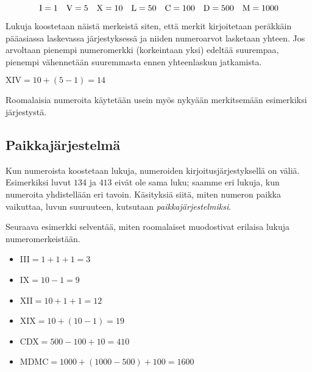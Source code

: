 \begin{equation*}
\rm I=1\quad
V=5\quad
X=10\quad
L=50\quad
C=100\quad
D=500\quad
M=1 000
\end{equation*}


Lukuja koostetaan näistä merkeistä siten, että merkit kirjoitetaan peräkkäin pääasiassa laskevassa järjestyksessä ja niiden numeroarvot lasketaan yhteen. Jos arvoltaan pienempi numeromerkki (korkeintaan yksi) edeltää suurempaa, pienempi vähennetään suuremmasta ennen yhteenlaskun jatkamista.

\begin{esimerkki}
$\text{XIV} = 10 + (5 - 1) = 14$
\end{esimerkki}

Roomalaisia numeroita käytetään usein myös nykyään merkitsemään esimerkiksi järjestystä.

\subsection*{Paikkajärjestelmä}

Kun numeroista koostetaan lukuja, numeroiden kirjoitusjärjestyksellä on väliä. Esimerkiksi luvut $134$ ja $413$ eivät ole sama luku; saamme eri lukuja, kun numeroita yhdistellään eri tavoin. Käsityksiä siitä, miten numeron paikka vaikuttaa, luvun suuruuteen, kutsutaan \emph{paikkajärjestelmiksi}.

Seuraava esimerkki selventää, miten roomalaiset muodostivat erilaisa lukuja numeromerkeistään.

\begin{esimerkki}
\begin{itemize}
\item III$=1+1+1=3$
\item IX$=10-1=9$
\item XII$=10+1+1=12$
\item XIX$=10+(10-1)=19$
\item CDX$=500-100+10=410$
\item MDMC$=1 000+(1 000-500)+100=1600$
\end{itemize}
\end{esimerkki}


